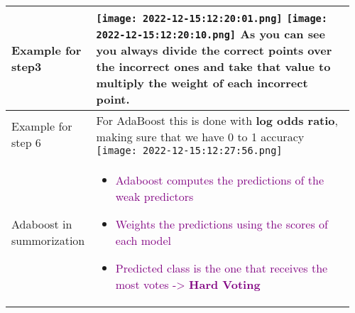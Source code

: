 \documentclass[main.tex,fontsize=8pt,paper=a4,paper=portrait,DIV=calc,]{scrartcl}
\begin{document}
\begin{table}[ht!]
\begin{tabular}{|m{0.2\linewidth}|m{0.755\linewidth}|}
\hline
Example for step3 & 
\vspace{2mm}
\texttt{[image: 2022-12-15:12:20:01.png]}\newline
\texttt{[image: 2022-12-15:12:20:10.png]}\newline
As you can see you always divide the correct points over the incorrect ones and take that value to multiply the weight of each incorrect point.
\\
\hline
Example for step 6& 
For AdaBoost this is done with \textbf{log odds ratio}, making sure that we have 0 to 1 accuracy\newline
\texttt{[image: 2022-12-15:12:27:56.png]}
\\
\hline
Adaboost in summorization &
\vspace{2mm}
\begin{itemize}
\item \textcolor{purple}{Adaboost computes the predictions of the weak predictors}
\item \textcolor{purple}{Weights the predictions using the scores of each model}
\item \textcolor{purple}{Predicted class is the one that receives the most votes -> \textbf{Hard Voting}}
\vspace{-3mm}
\end{itemize} 
\\
\hline

\hline

\hline

\hline
\end{tabular}
\end{table}
\end{document}
